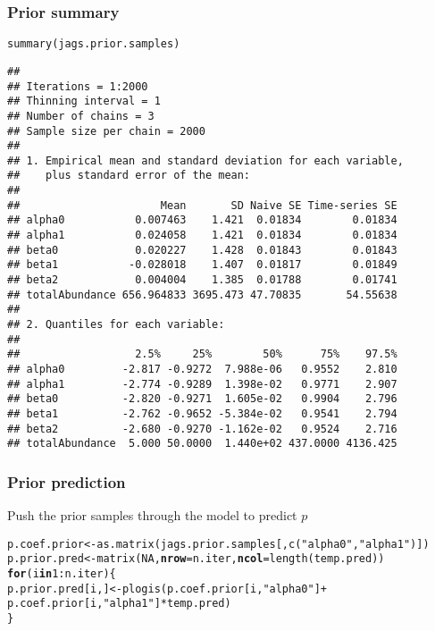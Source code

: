 \documentclass[color=usenames,dvipsnames]{beamer}\usepackage[]{graphicx}\usepackage[]{xcolor}
\makeatletter
\newcommand{\hlnum}[1]{\textcolor[rgb]{0.69,0.494,0}{#1}}%
\newcommand{\hlstr}[1]{\textcolor[rgb]{0.749,0.012,0.012}{#1}}%
\newcommand{\hlopt}[1]{\textcolor[rgb]{0,0,0}{#1}}%
\newcommand{\hlstd}[1]{\textcolor[rgb]{0,0,0}{#1}}%
\newcommand{\hlkwa}[1]{\textcolor[rgb]{0,0,0}{\textbf{#1}}}%
\newcommand{\hlkwb}[1]{\textcolor[rgb]{0,0.341,0.682}{#1}}%
\newcommand{\hlkwc}[1]{\textcolor[rgb]{0,0,0}{\textbf{#1}}}%
\newcommand{\hlkwd}[1]{\textcolor[rgb]{0.004,0.004,0.506}{#1}}%
\newenvironment{kframe}{%
 \def\at@end@of@kframe{}%
 \ifinner\ifhmode%
  \def\at@end@of@kframe{\end{minipage}}%
  \begin{minipage}{\columnwidth}%
 \fi\fi%
 \def\FrameCommand##1{\hskip\@totalleftmargin \hskip-\fboxsep
 \colorbox{shadecolor}{##1}\hskip-\fboxsep
     \hskip-\linewidth \hskip-\@totalleftmargin \hskip\columnwidth}%
 \MakeFramed {\advance\hsize-\width
   \@totalleftmargin\z@ \linewidth\hsize
   \@setminipage}}%
 {\par\unskip\endMakeFramed%
 \at@end@of@kframe}
\newenvironment{knitrout}{}{} %
\makeatother
\begin{document}
\begin{frame}[fragile]
  \frametitle{Prior summary}
\begin{knitrout}\tiny
{}\color{fgcolor}\begin{kframe}
\begin{alltt}
\hlkwd{summary}\hlstd{(jags.prior.samples)}
\end{alltt}
\begin{verbatim}
## 
## Iterations = 1:2000
## Thinning interval = 1 
## Number of chains = 3 
## Sample size per chain = 2000 
## 
## 1. Empirical mean and standard deviation for each variable,
##    plus standard error of the mean:
## 
##                      Mean       SD Naive SE Time-series SE
## alpha0           0.007463    1.421  0.01834        0.01834
## alpha1           0.024058    1.421  0.01834        0.01834
## beta0            0.020227    1.428  0.01843        0.01843
## beta1           -0.028018    1.407  0.01817        0.01849
## beta2            0.004004    1.385  0.01788        0.01741
## totalAbundance 656.964833 3695.473 47.70835       54.55638
## 
## 2. Quantiles for each variable:
## 
##                  2.5%     25%        50%      75%    97.5%
## alpha0         -2.817 -0.9272  7.988e-06   0.9552    2.810
## alpha1         -2.774 -0.9289  1.398e-02   0.9771    2.907
## beta0          -2.820 -0.9271  1.605e-02   0.9904    2.796
## beta1          -2.762 -0.9652 -5.384e-02   0.9541    2.794
## beta2          -2.680 -0.9270 -1.162e-02   0.9524    2.716
## totalAbundance  5.000 50.0000  1.440e+02 437.0000 4136.425
\end{verbatim}
\end{kframe}
\end{knitrout}
\end{frame}






\begin{frame}[fragile]
  \frametitle{Prior prediction}
  \small
  Push the prior samples through the model to predict $p$
\begin{knitrout}\scriptsize
{}\color{fgcolor}\begin{kframe}
\begin{alltt}
\hlstd{p.coef.prior} \hlkwb{<-} \hlkwd{as.matrix}\hlstd{(jags.prior.samples[,}\hlkwd{c}\hlstd{(}\hlstr{"alpha0"}\hlstd{,}\hlstr{"alpha1"}\hlstd{)])}
\hlstd{p.prior.pred} \hlkwb{<-} \hlkwd{matrix}\hlstd{(}\hlnum{NA}\hlstd{,} \hlkwc{nrow}\hlstd{=n.iter,} \hlkwc{ncol}\hlstd{=}\hlkwd{length}\hlstd{(temp.pred))}
\hlkwa{for}\hlstd{(i} \hlkwa{in} \hlnum{1}\hlopt{:}\hlstd{n.iter) \{}
    \hlstd{p.prior.pred[i,]} \hlkwb{<-} \hlkwd{plogis}\hlstd{(p.coef.prior[i,}\hlstr{"alpha0"}\hlstd{]} \hlopt{+}
                               \hlstd{p.coef.prior[i,}\hlstr{"alpha1"}\hlstd{]}\hlopt{*}\hlstd{temp.pred)}
\hlstd{\}}
\end{alltt}
\end{kframe}
\end{knitrout}
\end{frame}
\end{document}
